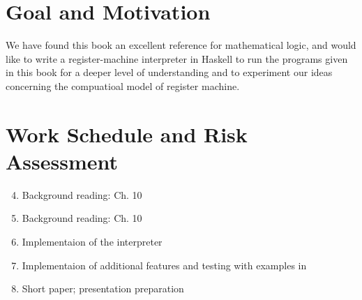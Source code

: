 \documentclass[english]{article}
\begin{document}
\section{Goal and Motivation}
We have found this book an excellent reference for mathematical logic, 
and would like to write a register-machine interpreter in Haskell 
to run the programs given in this book for a deeper level of understanding 
and to experiment our ideas concerning the compuatioal model of register machine.
%
%
\section{Work Schedule and Risk Assessment}
\begin{enumerate}[Week 1.]
\setcounter{enumi}{3}
\item Background reading: \cite{ebbinghaus2013mathematical} Ch. 10
\item Background reading: \cite{ebbinghaus2013mathematical} Ch. 10
\item Implementaion of the interpreter
\item Implementaion of additional features and testing with examples in \cite{ebbinghaus2013mathematical}
\item Short paper; presentation preparation
\end{enumerate}


%

\end{document}
